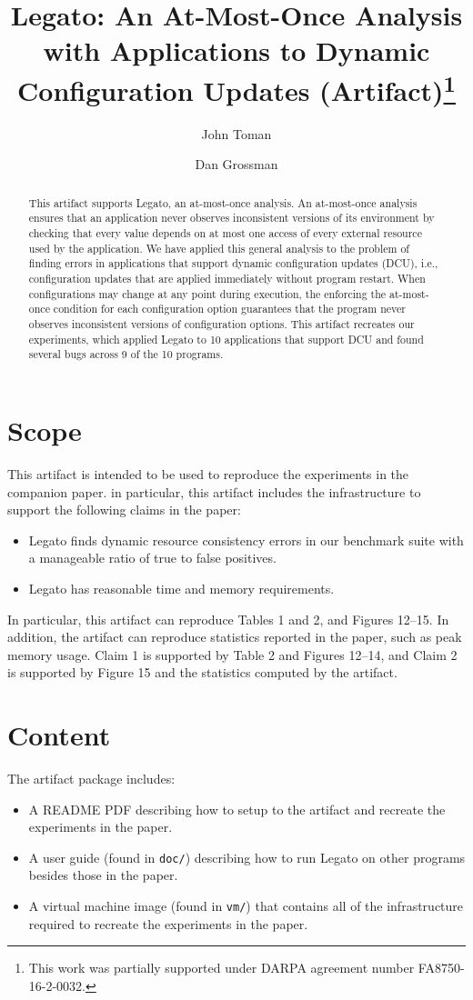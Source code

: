 \documentclass[a4paper,UKenglish]{darts-v2018}
\title{Legato: An At-Most-Once Analysis with Applications to Dynamic Configuration Updates (Artifact)\footnote{This work was partially supported under DARPA agreement number FA8750-16-2-0032.}}
\author{John Toman}{Paul G. Allen School of Computer Science \& Engineering, University of
Washington, USA}{jtoman@cs.washington.edu}{}{}{}
\author{Dan Grossman}{Paul G. Allen School of Computer Science \& Engineering, University of
  Washington, USA}{djg@cs.washington.edu}{}{}{}
\newenvironment{scope}{\section{Scope}}{}
\newenvironment{content}{\section{Content}}{}
\begin{document}
\maketitle

\begin{abstract}
  This artifact supports Legato, an at-most-once analysis. An
  at-most-once analysis ensures that an application never observes
  inconsistent versions of its environment by checking that every
  value depends on at most one access of every external resource used
  by the application. We have applied this general analysis to the
  problem of finding errors in applications that support dynamic
  configuration updates (DCU), i.e., configuration updates that are
  applied immediately without program restart. When configurations may
  change at any point during execution, the enforcing the at-most-once
  condition for each configuration option guarantees that the program
  never observes inconsistent versions of configuration options. This
  artifact recreates our experiments, which applied Legato to 10
  applications that support DCU and found several bugs across 9 of the
  10 programs.
\end{abstract}

\begin{scope}
  This artifact is intended to be used to reproduce the experiments in
  the companion paper.  in particular, this artifact includes the
  infrastructure to support the following claims in the paper:
  \begin{itemize}
  \item Legato finds dynamic resource consistency errors in our
    benchmark suite with a manageable ratio of true to false positives.
  \item Legato has reasonable time and memory requirements.
  \end{itemize}

  In particular, this artifact can reproduce Tables 1 and 2, and
  Figures 12--15. In addition, the artifact can reproduce statistics
  reported in the paper, such as peak memory usage. Claim 1 is
  supported by Table 2 and Figures 12--14, and Claim 2 is supported by
  Figure 15 and the statistics computed by the artifact.
\end{scope}

\begin{content}
The artifact package includes:
\begin{itemize}
\item A README PDF describing how to setup to the artifact and
  recreate the experiments in the paper.
\item A user guide (found in \texttt{doc/}) describing how to run
  Legato on other programs besides those in the paper.
\item A virtual machine image (found in \texttt{vm/}) that contains
  all of the infrastructure required to recreate the experiments in the paper.
\end{itemize}
\end{content}
\end{document}
